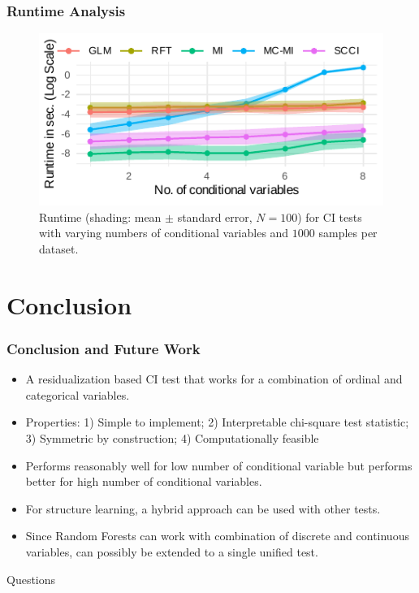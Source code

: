 \documentclass{beamer}
\begin{document}
\begin{frame}
	\frametitle{Runtime Analysis}
	\begin{figure}
		\centering
		\includegraphics{imgs/runtime.pdf}
		\caption*{Runtime (shading: mean $\pm$ standard error, $N=100$)
		for CI tests with varying numbers of conditional variables and
		$1000$ samples per dataset.
		}
	\end{figure}
\end{frame}

\section{Conclusion}
\begin{frame}
	\frametitle{Conclusion and Future Work}
	\begin{itemize}
		\setlength\itemsep{1em}
		\item A residualization based CI test that works for a combination of ordinal and categorical variables.
		\item Properties: 1) Simple to implement; 2) Interpretable chi-square test statistic; 3) Symmetric by construction; 4) Computationally feasible
		\item Performs reasonably well for low number of
			conditional variable but performs better for high
			number of conditional variables.
		\item For structure learning, a hybrid approach can be used with other
			tests.
		\item Since Random Forests can work with combination of discrete and 
			continuous variables, can possibly be extended to a single 
			unified test.
	\end{itemize}
\end{frame}

\begin{frame}
	\begin{center}
		\Huge{Questions}
	\end{center}
\end{frame}
\end{document}
